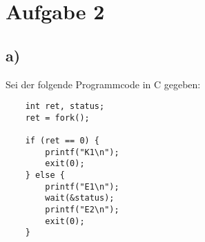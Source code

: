 \chapter{Aufgabe 2}

\section{a)}

Sei der folgende Programmcode in C gegeben:

\begin{verbatim}
    int ret, status;
    ret = fork();

    if (ret == 0) {
        printf("K1\n");
        exit(0);
    } else {
        printf("E1\n");
        wait(&status);
        printf("E2\n");
        exit(0);
    }
\end{verbatim}\\



